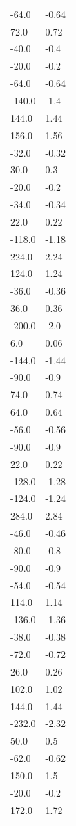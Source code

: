 \begin{longtable}{ll}
-64.0 & -0.64 \\
72.0 & 0.72 \\
-40.0 & -0.4 \\
-20.0 & -0.2 \\
-64.0 & -0.64 \\
-140.0 & -1.4 \\
144.0 & 1.44 \\
156.0 & 1.56 \\
-32.0 & -0.32 \\
30.0 & 0.3 \\
-20.0 & -0.2 \\
-34.0 & -0.34 \\
22.0 & 0.22 \\
-118.0 & -1.18 \\
224.0 & 2.24 \\
124.0 & 1.24 \\
-36.0 & -0.36 \\
36.0 & 0.36 \\
-200.0 & -2.0 \\
6.0 & 0.06 \\
-144.0 & -1.44 \\
-90.0 & -0.9 \\
74.0 & 0.74 \\
64.0 & 0.64 \\
-56.0 & -0.56 \\
-90.0 & -0.9 \\
22.0 & 0.22 \\
-128.0 & -1.28 \\
-124.0 & -1.24 \\
284.0 & 2.84 \\
-46.0 & -0.46 \\
-80.0 & -0.8 \\
-90.0 & -0.9 \\
-54.0 & -0.54 \\
114.0 & 1.14 \\
-136.0 & -1.36 \\
-38.0 & -0.38 \\
-72.0 & -0.72 \\
26.0 & 0.26 \\
102.0 & 1.02 \\
144.0 & 1.44 \\
-232.0 & -2.32 \\
50.0 & 0.5 \\
-62.0 & -0.62 \\
150.0 & 1.5 \\
-20.0 & -0.2 \\
172.0 & 1.72 \\

\end{longtable}
